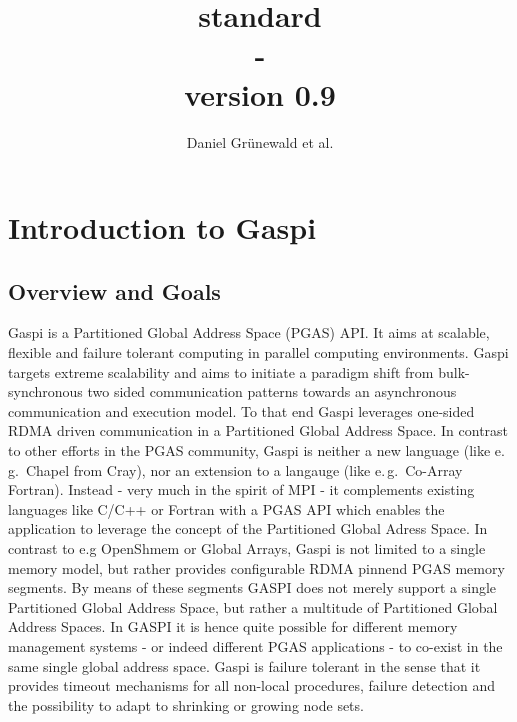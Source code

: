 \documentclass{article}
\title{\GASPI{} standard \\ - \\ \small version 0.9}
\author{Daniel Gr\"unewald et al.}
\makeatletter
\newlength{\st}\setlength{\st}{0pt}
\newcommand{\GASPI}{{\sc Gaspi}}
\newcounter{counttodo}
\newlength{\savetabcolsep}
\newlength{\savearrayrulewidth}
\newenvironment{todo}
{\stepcounter{counttodo}
 \typeout{Environment TODO call \thecounttodo}
 \setlength{\savetabcolsep}{\tabcolsep}
 \setlength{\savearrayrulewidth}{\arrayrulewidth}
 \renewcommand{\tabcolsep}{0pt}
 \renewcommand{\arrayrulewidth}{2pt}
 \begin{center}
 \begin{tabular}{c|l@{\hspace*{2em}}|@{\hspace*{2em}}c}
 &
 \begin{minipage}{0.66\textwidth}
 \begin{itemize}
}
{\end{itemize}
 \end{minipage}
 &  todo \#\thecounttodo
 \end{tabular} \marginpar{$\Longleftarrow$}
 \end{center}
 \renewcommand{\tabcolsep}{\savetabcolsep}
 \renewcommand{\arrayrulewidth}{\savearrayrulewidth}
}
\makeatother
\begin{document}
\begin{titlepage}
\maketitle
\end{titlepage}

\tableofcontents


\newpage


\section{Introduction to \GASPI{}}
\label{sec::Intro}


\subsection{Overview and Goals}
\label{subsec::Overview}

\GASPI{} is a Partitioned Global Address Space (PGAS) API. It aims at scalable,
flexible and failure tolerant computing in parallel computing environments.
\GASPI{} targets extreme scalability and aims to initiate a paradigm shift from
bulk-synchronous  two sided communication patterns towards an asynchronous
communication and execution model. To that end \GASPI{} leverages one-sided RDMA
driven communication in a Partitioned Global Address Space. In contrast to other
efforts in the PGAS community, \GASPI{} is neither a new language (like e.\,g.\ Chapel from Cray),
nor an extension to a langauge (like e.\,g.\ Co-Array Fortran). Instead - very much in the spirit of MPI -
it complements existing languages like C/C++ or Fortran with a PGAS API which enables
the application to leverage the concept of the Partitioned Global Adress Space.
In contrast to e.g OpenShmem or Global Arrays, \GASPI{} is not limited to a single
memory model, but rather provides configurable RDMA pinnend PGAS memory segments.
By means of these segments GASPI does not merely support a single Partitioned Global Address Space,
but rather a multitude of Partitioned Global Address Spaces. In GASPI it is hence quite possible
for different memory management systems - or indeed different PGAS applications - to co-exist in
the same single global address space. \GASPI{} is failure tolerant in the sense that it provides
timeout mechanisms for all non-local procedures, failure detection and the possibility to adapt
to shrinking or growing node sets.
\end{document}
